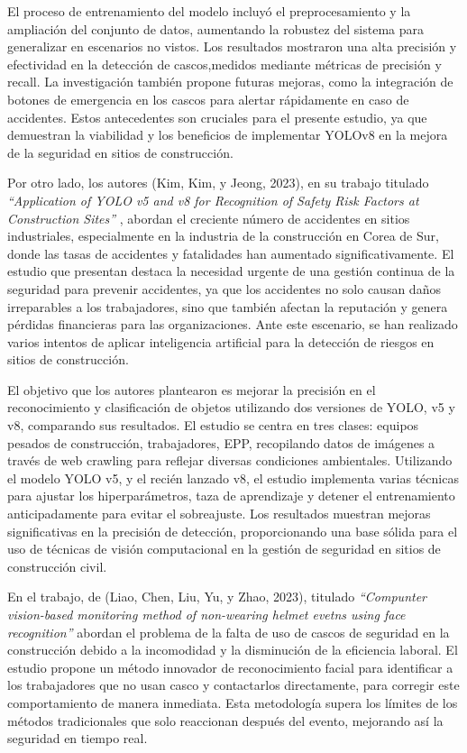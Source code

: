 \noindent
El proceso de entrenamiento del modelo incluyó el preprocesamiento y la ampliación del conjunto de datos, aumentando la robustez del sistema para generalizar en escenarios no vistos. Los resultados mostraron una alta precisión y efectividad en la detección de cascos,medidos mediante métricas de precisión y recall. La investigación también propone futuras mejoras, como la integración de botones de emergencia en los cascos para alertar rápidamente en caso de accidentes. Estos antecedentes son cruciales para el presente estudio, ya que demuestran la viabilidad y los beneficios de implementar YOLOv8 en la mejora de la seguridad en sitios de construcción.

Por otro lado, los autores (Kim, Kim, y Jeong, 2023), en su trabajo titulado \textit{``Application of YOLO v5 and v8 for Recognition of Safety Risk Factors at Construction Sites''} \cite{kim2023application}, abordan el creciente número de accidentes en sitios industriales, especialmente en la industria de la construcción en Corea de Sur, donde las tasas de accidentes y fatalidades han aumentado significativamente. El estudio que presentan destaca la necesidad urgente de una gestión continua de la seguridad para prevenir accidentes, ya que los accidentes no solo causan daños irreparables a los trabajadores, sino que también afectan la reputación y genera pérdidas financieras para las organizaciones. Ante este escenario, se han realizado varios intentos de aplicar inteligencia artificial para la detección de riesgos en sitios de construcción.

\noindent
El objetivo que los autores plantearon es mejorar la precisión en el reconocimiento y clasificación de objetos utilizando dos versiones de YOLO, v5 y v8, comparando sus resultados. El estudio se centra en tres clases: equipos pesados de construcción, trabajadores, EPP, recopilando datos de imágenes a través de web crawling para reflejar diversas condiciones ambientales. Utilizando el modelo YOLO v5, y el recién lanzado v8, el estudio implementa varias técnicas para ajustar los hiperparámetros, taza de aprendizaje y detener el entrenamiento anticipadamente para evitar el sobreajuste. Los resultados muestran mejoras significativas en la precisión de detección, proporcionando una base sólida para el uso de técnicas de visión computacional en la gestión de seguridad en sitios de construcción civil.

En el trabajo, de (Liao, Chen, Liu, Yu, y Zhao, 2023), titulado \textit{``Compunter vision-based monitoring method of non-wearing helmet evetns using face recognition''} \cite{liao2023computer} abordan el problema de la falta de uso de cascos de seguridad en la construcción debido a la incomodidad y la disminución de la eficiencia laboral. El estudio propone un método innovador de reconocimiento facial para identificar a los trabajadores que no usan casco y contactarlos directamente, para corregir este comportamiento de manera inmediata. Esta metodología supera los límites de los métodos tradicionales que solo reaccionan después del evento, mejorando así la seguridad en tiempo real.

